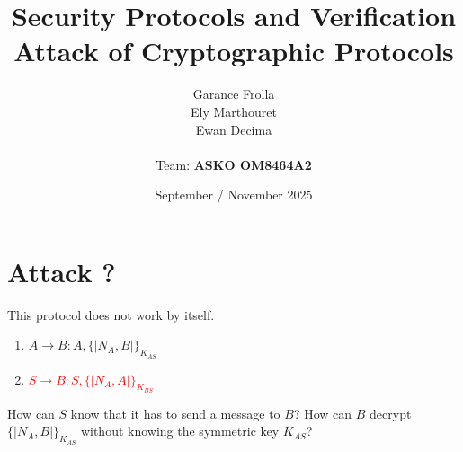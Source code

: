 \documentclass[11pt]{article}
\begin{document}
    \title{
            { \textbf{Security Protocols and Verification}} \\[1ex]
        {\small Attack of Cryptographic Protocols}
    }


    \author{
        Garance Frolla \\
        Ely Marthouret \\
        Ewan Decima\\ \\
        Team: \textbf{ASKO OM8464A2}
    }

    \date{September / November 2025}


    \maketitle
    \tableofcontents
    \newpage

    \section{Attack ?}

    This protocol does not work by itself.

    \begin{enumerate}
        \item $A \rightarrow B : A, \{|N_A, B|\}_{K_{AS}}$
        \item \textcolor{red}{$S \rightarrow B: S, \{|N_A, A|\}_{K_{BS}}$}


    \end{enumerate}

    How can $S$ know that it has to send a message to $B$? How can $B$ decrypt $\{|N_A, B|\}_{K_{AS}}$ without knowing the symmetric key $K_{AS}$?


    
\end{document}
